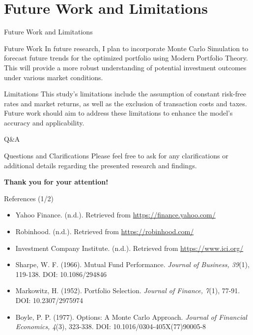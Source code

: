 \documentclass{beamer}
\begin{document}
\section{Future Work and Limitations}
\begin{frame}{Future Work and Limitations}
    \begin{block}{Future Work}
        In future research, I plan to incorporate Monte Carlo Simulation to forecast future trends for the optimized portfolio using Modern Portfolio Theory. This will provide a more robust understanding of potential investment outcomes under various market conditions.
    \end{block}
    \begin{block}{Limitations}
        This study's limitations include the assumption of constant risk-free rates and market returns, as well as the exclusion of transaction costs and taxes. Future work should aim to address these limitations to enhance the model's accuracy and applicability.
    \end{block}
\end{frame}

\begin{frame}{Q\&A}
    \begin{block}{Questions and Clarifications}
        Please feel free to ask for any clarifications or additional details regarding the presented research and findings.
    \end{block}
    \vspace{1cm}
    \begin{center}
        \Large \textbf{Thank you for your attention!}
    \end{center}
\end{frame}

\begin{frame}{References (1/2)}
    \begin{block}{}
        \begin{itemize}
            \item Yahoo Finance. (n.d.). Retrieved from \url{https://finance.yahoo.com/}
            \item Robinhood. (n.d.). Retrieved from \url{https://robinhood.com/}
            \item Investment Company Institute. (n.d.). Retrieved from \url{https://www.ici.org/}
        \end{itemize}
    \end{block}
    \begin{block}{}
        \begin{itemize}
            \item Sharpe, W. F. (1966). Mutual Fund Performance. \textit{Journal of Business, 39}(1), 119-138. DOI: 10.1086/294846
            \item Markowitz, H. (1952). Portfolio Selection. \textit{Journal of Finance, 7}(1), 77-91. DOI: 10.2307/2975974
            \item Boyle, P. P. (1977). Options: A Monte Carlo Approach. \textit{Journal of Financial Economics, 4}(3), 323-338. DOI: 10.1016/0304-405X(77)90005-8
        \end{itemize}
    \end{block}
\end{frame}
\end{document}
